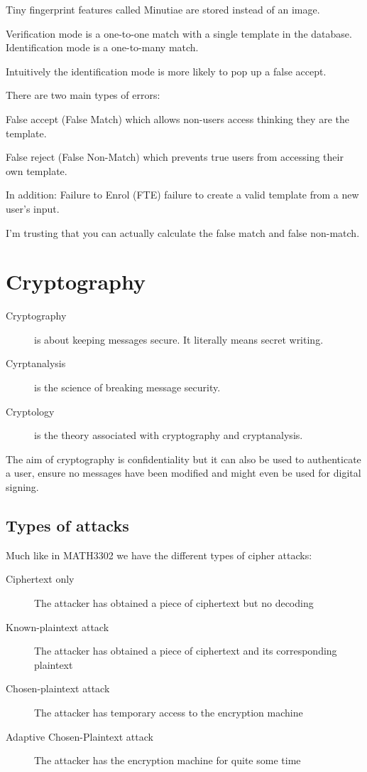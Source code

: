\documentclass{report}
\begin{document}
Tiny fingerprint features called Minutiae are stored instead of an image.

Verification mode is a one-to-one match with a single template in the database.
Identification mode is a one-to-many match.

Intuitively the identification mode is more likely to pop up a false accept.

There are two main types of errors:

False accept (False Match) which allows non-users access thinking they are the
template.

False reject (False Non-Match) which prevents true users from accessing their
own template.

In addition:
Failure to Enrol (FTE) failure to create a valid template from a new user's
input.

I'm trusting that you can actually calculate the false match and false non-match.

\chapter{Cryptography}
\begin{description}
    \item [Cryptography] is about keeping messages secure. It literally means
secret writing.

    \item [Cyrptanalysis] is the science of breaking message security.

    \item [Cryptology] is the theory associated with
        cryptography and cryptanalysis.
\end{description}

The aim of cryptography is confidentiality but it can also be used to
authenticate a user, ensure no messages have been modified and
might even be used for digital signing.

\section{Types of attacks}
Much like in MATH3302 we have the different types of cipher attacks:
\begin{description}
    \item [Ciphertext only]
        The attacker has obtained a piece of ciphertext but no decoding
    \item [Known-plaintext attack]
        The attacker has obtained a piece of ciphertext and its corresponding
        plaintext
    \item [Chosen-plaintext attack]
        The attacker has temporary access to the encryption machine
    \item [Adaptive Chosen-Plaintext attack]
        The attacker has the encryption machine for quite some time
\end{description}
\end{document}
